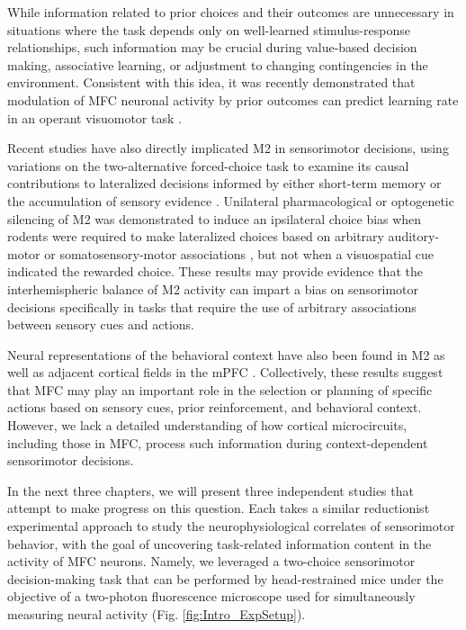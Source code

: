 While information related to prior choices and their outcomes are unnecessary in situations where the task depends only on well-learned stimulus-response relationships, such information may be crucial during value-based decision making, associative learning, or adjustment to changing contingencies in the environment. Consistent with this idea, it was recently demonstrated that modulation of MFC neuronal activity by prior outcomes can predict learning rate in an operant visuomotor task \citep{mao2019cortical}. 

Recent studies have also directly implicated M2 in sensorimotor decisions, using variations on the two-alternative forced-choice task to examine its causal contributions to lateralized decisions informed by either short-term memory \citep{erlich2011cortical,guo2014flow,kopec2015cortical} or the accumulation of sensory evidence \citep{erlich2015distinct,hanks2015distinct}. Unilateral pharmacological \citep{erlich2011cortical} or optogenetic silencing of M2 \citep{hanks2015distinct,kopec2015cortical} was demonstrated to induce an ipsilateral choice bias when rodents were required to make lateralized choices based on arbitrary auditory-motor \citep{erlich2011cortical,kopec2015cortical} or somatosensory-motor associations \citep{guo2014flow}, but not when a visuospatial cue indicated the rewarded choice. These results may provide evidence that the interhemispheric balance of M2 activity can impart a bias on sensorimotor decisions specifically in tasks that require the use of arbitrary associations between sensory cues and actions. 

Neural representations of the behavioral context have also been found in M2 \citep{durstewitz2010abrupt,hyman2012contextual,siniscalchi2016fast} as well as adjacent cortical fields in the mPFC \citep{rich2009rat}. Collectively, these results suggest that MFC may play an important role in the selection or planning of specific actions based on sensory cues, prior reinforcement, and behavioral context. However, we lack a detailed understanding of how cortical microcircuits, including those in MFC, process such information during context-dependent sensorimotor decisions. 

In the next three chapters, we will present three independent studies that attempt to make progress on this question. Each takes a similar reductionist experimental approach to study the neurophysiological correlates of sensorimotor behavior, with the goal of uncovering task-related information content in the activity of MFC neurons. Namely, we leveraged a two-choice sensorimotor decision-making task that can be performed by head-restrained mice under the objective of a two-photon fluorescence microscope used for simultaneously measuring neural activity (Fig. \ref{fig:Intro_ExpSetup}). 

